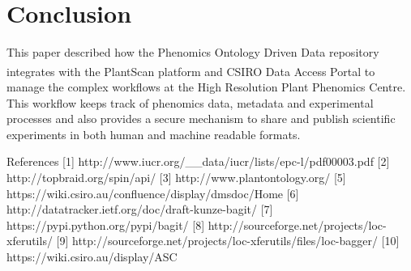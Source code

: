 \documentclass{llncs}
\begin{document}
\section{Conclusion}
This paper described how the Phenomics Ontology Driven Data repository
integrates with the PlantScan\textsuperscript{\texttrademark} platform and CSIRO
Data Access Portal to manage
the complex workflows at the High Resolution Plant Phenomics Centre. This
workflow keeps track of phenomics data, metadata and experimental processes and
also provides a secure mechanism to share and publish scientific experiments in
both human and machine readable formats.




References
[1] http://www.iucr.org/\_\_data/iucr/lists/epc-l/pdf00003.pdf
[2] http://topbraid.org/spin/api/
[3] http://www.plantontology.org/
[5] https://wiki.csiro.au/confluence/display/dmsdoc/Home
[6] http://datatracker.ietf.org/doc/draft-kunze-bagit/
[7] https://pypi.python.org/pypi/bagit/
[8] http://sourceforge.net/projects/loc-xferutils/
[9] http://sourceforge.net/projects/loc-xferutils/files/loc-bagger/
[10] https://wiki.csiro.au/display/ASC
\end{document}

